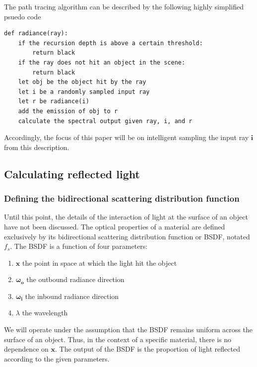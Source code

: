 \documentclass[12pt]{article}
\begin{document}
The path tracing algorithm can be described by the following highly simplified psuedo code
\begin{lstlisting}
def radiance(ray):
    if the recursion depth is above a certain threshold:
        return black
    if the ray does not hit an object in the scene:
        return black
    let obj be the object hit by the ray
    let i be a randomly sampled input ray
    let r be radiance(i)
    add the emission of obj to r
    calculate the spectral output given ray, i, and r
\end{lstlisting}
Accordingly, the focus of this paper will be on intelligent sampling the input ray \(\bm i\) from this description.

\subsection{Calculating reflected light}
\subsubsection{Defining the bidirectional scattering distribution function}
Until this point, the details of the interaction of light at the surface of an object have not been discussed.
The optical properties of a material are defined exclusively by its bidirectional scattering distribution function or BSDF, notated \(f_s\).
The BSDF is a function of four parameters:
\begin{enumerate}
\item \(\mathbf x\) the point in space at which the light hit the object
\item \(\bm{\omega_o}\) the outbound radiance direction
\item \(\bm{\omega_i}\) the inbound radiance direction
\item \(\lambda\) the wavelength
\end{enumerate}
We will operate under the assumption that the BSDF remains uniform across the surface of an object.
Thus, in the context of a specific material, there is no dependence on \(\mathbf x\).
The output of the BSDF is the proportion of light reflected according to the given parameters.
\end{document}
